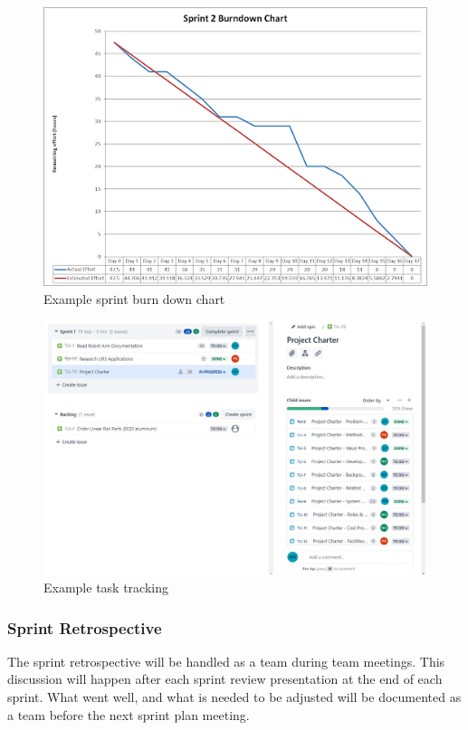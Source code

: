 \begin{figure}[h!]
    \centering
    \includegraphics[width=1.0\textwidth]{images/burndown.png}
    \caption{Example sprint burn down chart}
\end{figure}

\begin{figure}[h!]
    \centering
    \includegraphics[width=1.0\textwidth]{images/sprint-burndown-tasks.jpg}
    \caption{Example task tracking}
\end{figure}


\subsubsection{Sprint Retrospective}
The sprint retrospective will be handled as a team during team meetings. This discussion will happen after each sprint review presentation at the end of each sprint. What went well, and what is needed to be adjusted will be documented as a team before the next sprint plan meeting.

